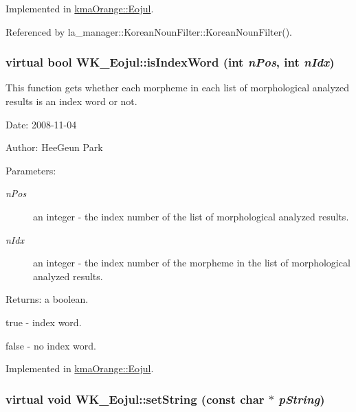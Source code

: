 Implemented in \hyperlink{classkmaOrange_1_1Eojul_59b5129bafa674c7f13a64c75f92cbcd}{kmaOrange::Eojul}.

Referenced by la\_\-manager::KoreanNounFilter::KoreanNounFilter().\hypertarget{classWK__Eojul_fcffd7053b36792cbd4dcca3a0949542}{
\subsubsection[{isIndexWord}]{\setlength{\rightskip}{0pt plus 5cm}virtual bool WK\_\-Eojul::isIndexWord (int {\em nPos}, \/  int {\em nIdx})}}
\label{classWK__Eojul_fcffd7053b36792cbd4dcca3a0949542}


This function gets whether each morpheme in each list of morphological analyzed results is an index word or not. 

\begin{Desc}
\item[Date:]2008-11-04 \end{Desc}
\begin{Desc}
\item[Author:]HeeGeun Park \end{Desc}
\begin{Desc}
\item[Parameters:]
\begin{description}
\item[{\em nPos}]an integer - the index number of the list of morphological analyzed results. \item[{\em nIdx}]an integer - the index number of the morpheme in the list of morphological analyzed results. \end{description}
\end{Desc}
\begin{Desc}
\item[Returns:]a boolean.\par
 true - index word.\par
 false - no index word. \end{Desc}


Implemented in \hyperlink{classkmaOrange_1_1Eojul_01a808fcd00cb51d2fe0fe1e3d390cb4}{kmaOrange::Eojul}.\hypertarget{classWK__Eojul_ddb3f1626f2dd6f0dc4bcfe8de43fd05}{
\subsubsection[{setString}]{\setlength{\rightskip}{0pt plus 5cm}virtual void WK\_\-Eojul::setString (const char $\ast$ {\em pString})}}
\label{classWK__Eojul_ddb3f1626f2dd6f0dc4bcfe8de43fd05}


